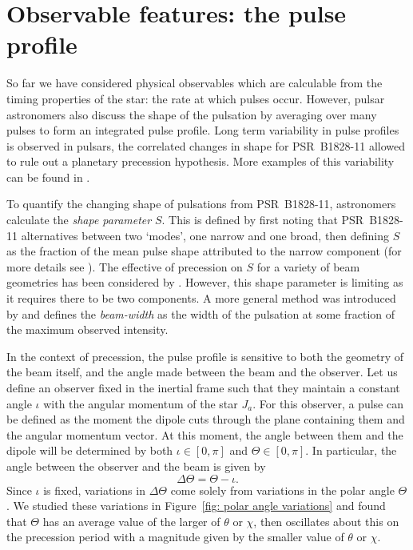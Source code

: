 \documentclass[../full_thesis/full_thesis.tex]{subfiles}
\begin{document}
\section{Observable features: the pulse profile}
\label{sec: observable features: shape}

So far we have considered physical observables which are calculable from the
timing properties of the star: the rate at which pulses occur. However, pulsar
astronomers also discuss the shape of the pulsation by averaging over many
pulses to form an integrated pulse profile.  Long term variability in pulse
profiles is observed in pulsars, the correlated changes in shape for
PSR~B1828-11 allowed \citet{Stairs2000} to rule out a planetary precession
hypothesis. More examples of this variability can be found in \citet{Lyne2010}.

To quantify the changing shape of pulsations from PSR~B1828-11, astronomers
calculate the \emph{shape parameter} $S$. This is defined by first noting that
PSR~B1828-11 alternatives between two `modes', one narrow and one broad, then
defining $S$ as the fraction of the mean pulse shape attributed to the narrow
component (for more details see \citet{Stairs2003}). The effective of
precession on $S$ for a variety of beam geometries has been considered by
\citet{Akgun2006}.  However, this shape parameter is limiting as it requires
there to be two components.  A more general method was introduced by
\citet{Lyne2010} and defines the \emph{beam-width} as the width of the
pulsation at some fraction of the maximum observed intensity.

In the context of precession, the pulse profile is sensitive to both the
geometry of the beam itself, and the angle made between the beam and the
observer.  Let us define an observer fixed in the inertial frame such that they
maintain a constant angle $\iota$ with the angular momentum of the star $J_a$.
For this observer, a pulse can be defined as the moment the dipole cuts through
the plane containing them and the angular momentum vector. At this moment, the
angle between them and the dipole will be determined by both $\iota \in [0, \pi]$ and
$\Theta \in [0, \pi]$. In particular, the angle between the observer and the beam
is given by
\begin{equation}
\Delta\Theta = \Theta - \iota.
\label{eqn: delta Theta}
\end{equation}
Since $\iota$ is fixed, variations in $\Delta\Theta$ come solely from
variations in the polar angle $\Theta$. We studied these variations in
Figure~\ref{fig: polar angle variations} and found that $\Theta$ has an
average value of the larger of $\theta$ or $\chi$, then oscillates about this
on the precession period with a magnitude given by the smaller value of
$\theta$ or $\chi$.
\end{document}
